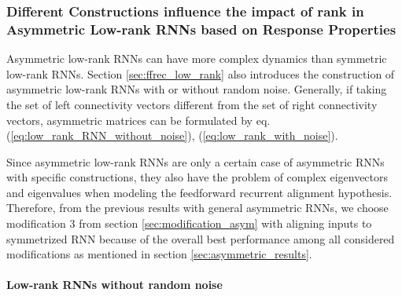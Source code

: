 \documentclass[11pt]{article}
\begin{document}
	\subsubsection{Different Constructions influence the impact of rank in Asymmetric Low-rank RNNs based on Response Properties}
	
	Asymmetric low-rank RNNs can have more complex dynamics than symmetric low-rank RNNs. Section \ref{sec:ffrec_low_rank} also introduces the construction of asymmetric low-rank RNNs with or without random noise. Generally, if taking the set of left connectivity vectors different from the set of right connectivity vectors, asymmetric matrices can be formulated by eq.(\ref{eq:low_rank_RNN_without_noise}), (\ref{eq:low_rank_with_noise}). 
	
	Since asymmetric low-rank RNNs are only a certain case of asymmetric RNNs with specific constructions, they also have the problem of complex eigenvectors and eigenvalues when modeling the feedforward recurrent alignment hypothesis. Therefore, from the previous results with general asymmetric RNNs, we choose modification 3 from section \ref{sec:modification_asym} with aligning inputs to symmetrized RNN because of the overall best performance among all considered modifications as mentioned in section \ref{sec:asymmetric_results}.
	
	\paragraph{Low-rank RNNs without random noise}
	
\end{document}
